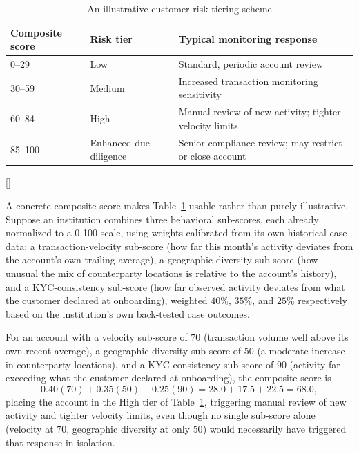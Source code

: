 \documentclass[../ai_in_finance]{subfiles}
\begin{document}
\begin{table}[htbp]
\centering
\begin{lrbox}{\bookmeasuredbox}
\begin{tabular}{lll}
\toprule
Composite score & Risk tier & Typical monitoring response \\
\midrule
0--29 & Low & Standard, periodic account review \\
30--59 & Medium & Increased transaction monitoring sensitivity \\
60--84 & High & Manual review of new activity; tighter velocity limits \\
85--100 & Enhanced due diligence & Senior compliance review; may restrict or close account \\
\bottomrule
\end{tabular}
\end{lrbox}
\ifdim\wd\bookmeasuredbox<0.65\linewidth
\setlength{\bookcapwidth}{0.65\linewidth}
\else
\setlength{\bookcapwidth}{\wd\bookmeasuredbox}
\fi
{}[\bookcapwidth]{
\usebox{\bookmeasuredbox}
}{
\caption{An illustrative customer risk-tiering scheme}
\label{tab:risk_tiers}
}
\end{table}

A concrete composite score makes Table~\ref{tab:risk_tiers} usable rather than purely illustrative. Suppose an institution combines three behavioral sub-scores, each already normalized to a 0-100 scale, using weights calibrated from its own historical case data: a transaction-velocity sub-score (how far this month's activity deviates from the account's own trailing average), a geographic-diversity sub-score (how unusual the mix of counterparty locations is relative to the account's history), and a KYC-consistency sub-score (how far observed activity deviates from what the customer declared at onboarding), weighted $40\%$, $35\%$, and $25\%$ respectively based on the institution's own back-tested case outcomes.

For an account with a velocity sub-score of $70$ (transaction volume well above its own recent average), a geographic-diversity sub-score of $50$ (a moderate increase in counterparty locations), and a KYC-consistency sub-score of $90$ (activity far exceeding what the customer declared at onboarding), the composite score is
\begin{equation*}
0.40(70) + 0.35(50) + 0.25(90) = 28.0 + 17.5 + 22.5 = 68.0,
\end{equation*}
placing the account in the High tier of Table~\ref{tab:risk_tiers}, triggering manual review of new activity and tighter velocity limits, even though no single sub-score alone (velocity at $70$, geographic diversity at only $50$) would necessarily have triggered that response in isolation.
\end{document}
